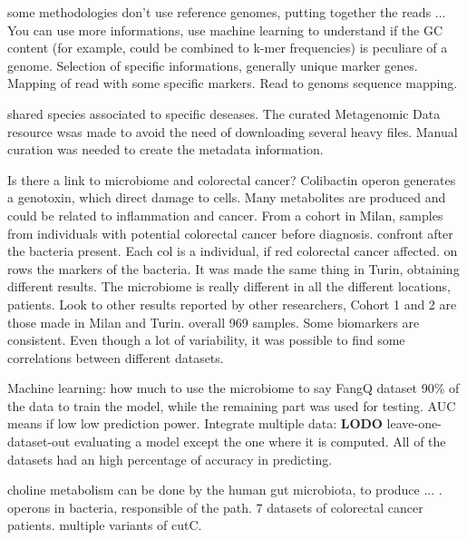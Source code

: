 some methodologies don't use reference genomes, putting together the reads ...
You can use more informations, use machine learning to understand if the GC content (for example, could be combined to k-mer frequencies) is peculiare of a genome.
Selection of specific informations, generally unique marker genes. Mapping of read with some specific markers. 
Read to genoms sequence mapping.

shared species associated to specific deseases. The curated Metagenomic Data resource wsas made to avoid the need of downloading several heavy files. Manual curation was needed to create the metadata information.

Is there a link to microbiome and colorectal cancer?
Colibactin operon generates a genotoxin, which direct damage to cells. Many metabolites are produced and could be related to inflammation and cancer. 
From a cohort in Milan, samples from individuals with potential colorectal cancer before diagnosis. confront after the bacteria present. Each col is a individual, if red colorectal cancer affected. on rows the markers of the bacteria. 
It was made the same thing in Turin, obtaining different results. The microbiome is really different in all the different locations, patients. 
Look to other results reported by other researchers, Cohort 1 and 2 are those made in Milan and Turin. overall 969 samples. Some biomarkers are consistent. Even though a lot of variability, it was possible to find some correlations between different datasets. 

Machine learning: how much to use the microbiome to say 
FangQ dataset 90\% of the data to train the model, while the remaining part was used for testing. AUC means if low low prediction power. 
Integrate multiple data: \textbf{LODO} leave-one-dataset-out evaluating a model except the one where it is computed. All of the datasets had an high percentage of accuracy in predicting. 

choline metabolism can be done by the human gut microbiota, to produce ... . operons in bacteria, responsible of the path. 7 datasets of colorectal cancer patients. multiple variants of cutC. 
 
 